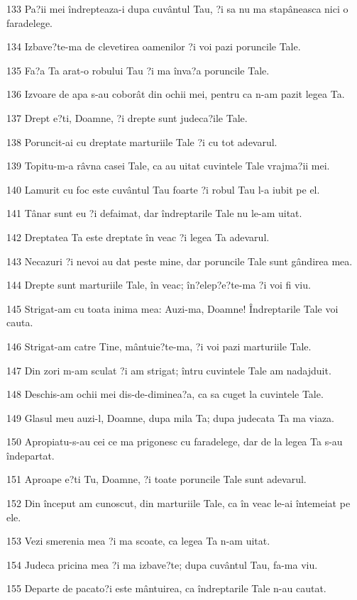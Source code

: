 \par 133 Pa?ii mei îndrepteaza-i dupa cuvântul Tau, ?i sa nu ma stapâneasca nici o faradelege.
\par 134 Izbave?te-ma de clevetirea oamenilor ?i voi pazi poruncile Tale.
\par 135 Fa?a Ta arat-o robului Tau ?i ma înva?a poruncile Tale.
\par 136 Izvoare de apa s-au coborât din ochii mei, pentru ca n-am pazit legea Ta.
\par 137 Drept e?ti, Doamne, ?i drepte sunt judeca?ile Tale.
\par 138 Poruncit-ai cu dreptate marturiile Tale ?i cu tot adevarul.
\par 139 Topitu-m-a râvna casei Tale, ca au uitat cuvintele Tale vrajma?ii mei.
\par 140 Lamurit cu foc este cuvântul Tau foarte ?i robul Tau l-a iubit pe el.
\par 141 Tânar sunt eu ?i defaimat, dar îndreptarile Tale nu le-am uitat.
\par 142 Dreptatea Ta este dreptate în veac ?i legea Ta adevarul.
\par 143 Necazuri ?i nevoi au dat peste mine, dar poruncile Tale sunt gândirea mea.
\par 144 Drepte sunt marturiile Tale, în veac; în?elep?e?te-ma ?i voi fi viu.
\par 145 Strigat-am cu toata inima mea: Auzi-ma, Doamne! Îndreptarile Tale voi cauta.
\par 146 Strigat-am catre Tine, mântuie?te-ma, ?i voi pazi marturiile Tale.
\par 147 Din zori m-am sculat ?i am strigat; întru cuvintele Tale am nadajduit.
\par 148 Deschis-am ochii mei dis-de-diminea?a, ca sa cuget la cuvintele Tale.
\par 149 Glasul meu auzi-l, Doamne, dupa mila Ta; dupa judecata Ta ma viaza.
\par 150 Apropiatu-s-au cei ce ma prigonesc cu faradelege, dar de la legea Ta s-au îndepartat.
\par 151 Aproape e?ti Tu, Doamne, ?i toate poruncile Tale sunt adevarul.
\par 152 Din început am cunoscut, din marturiile Tale, ca în veac le-ai întemeiat pe ele.
\par 153 Vezi smerenia mea ?i ma scoate, ca legea Ta n-am uitat.
\par 154 Judeca pricina mea ?i ma izbave?te; dupa cuvântul Tau, fa-ma viu.
\par 155 Departe de pacato?i este mântuirea, ca îndreptarile Tale n-au cautat.
